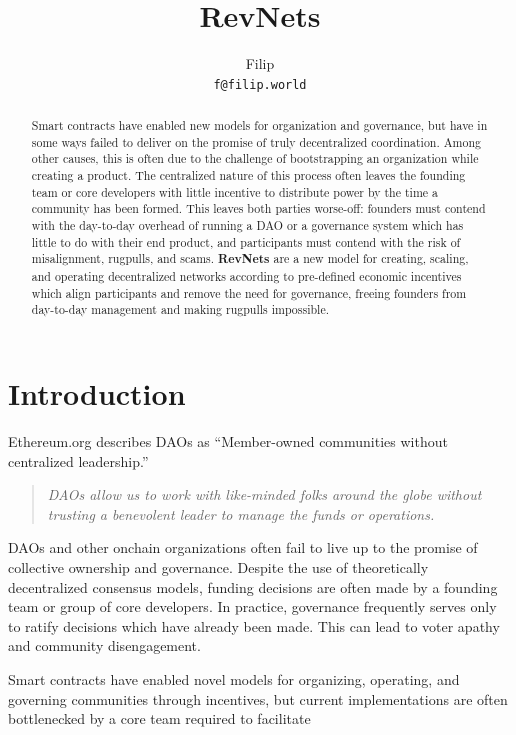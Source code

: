 \documentclass{article}
\title{RevNets}
\author{Filip\\ \texttt{f@filip.world}}
\begin{document}
\maketitle

\begin{abstract}
  Smart contracts have enabled new models for organization and governance, but have in some ways failed to deliver on the promise of truly decentralized coordination. Among other causes, this is often due to the challenge of bootstrapping an organization while creating a product. The centralized nature of this process often leaves the founding team or core developers with little incentive to distribute power by the time a community has been formed. This leaves both parties worse-off: founders must contend with the day-to-day overhead of running a DAO or a governance system which has little to do with their end product, and participants must contend with the risk of misalignment, rugpulls, and scams. \textbf{RevNets} are a new model for creating, scaling, and operating decentralized networks according to pre-defined economic incentives which align participants and remove the need for governance, freeing founders from day-to-day management and making rugpulls impossible.
\end{abstract}

\section{Introduction}

Ethereum.org\cite{daos} describes DAOs as ``Member-owned communities without centralized leadership.''

\begin{quote}
  \textit{DAOs allow us to work with like-minded folks around the globe without trusting a benevolent leader to manage the funds or operations.}
\end{quote}

DAOs and other onchain organizations often fail to live up to the promise of collective ownership and governance. Despite the use of theoretically decentralized consensus models, funding decisions are often made by a founding team or group of core developers. In practice, governance frequently serves only to ratify decisions which have already been made. This can lead to voter apathy and community disengagement.

Smart contracts have enabled novel models for organizing, operating, and governing communities through incentives, but current implementations are often bottlenecked by a core team required to facilitate
\end{document}

